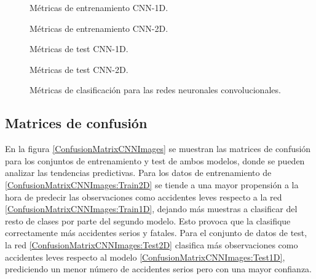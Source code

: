     \begin{figure}[H]
        \scriptsize
        \renewcommand{\arraystretch}{1.1}
        \begin{subtable}{.5\textwidth}        
          \caption{Métricas de entrenamiento CNN-1D.}
          \label{ClassificationReportCNN:TrainCNN1D}
        \end{subtable}
        \hspace{1em}
        \begin{subtable}{.5\textwidth}
          \centering
          \caption{Métricas de entrenamiento CNN-2D.}
          \label{ClassificationReportCNN:TrainCNN2D}
        \end{subtable}
        \vspace*{2mm}
        \begin{subtable}{.5\textwidth}     
          \caption{Métricas de test CNN-1D.}
          \label{ClassificationReportCNN:TestCNN1D}
        \end{subtable}
        \hspace{.75em}
        \begin{subtable}{.5\textwidth}     
          \centering
          \caption{Métricas de test CNN-2D.}
          \label{ClassificationReportCNN:TestCNN2D}
        \end{subtable}
        \caption{Métricas de clasificación para las redes neuronales convolucionales.}
        \label{ClassificationReportCNN}
    \end{figure}
  

  \subsection{Matrices de confusión}

    En la figura \eqref{ConfusionMatrixCNNImages} se muestran las matrices de confusión para los conjuntos de entrenamiento y test de ambos modelos, donde se pueden analizar las tendencias predictivas. Para los datos de entrenamiento de  \eqref{ConfusionMatrixCNNImages:Train2D} se tiende a una mayor propensión a la hora de predecir las observaciones como accidentes leves respecto a la red  \eqref{ConfusionMatrixCNNImages:Train1D}, dejando más muestras a clasificar del resto de clases por parte del segundo modelo. Esto provoca que la  clasifique correctamente más accidentes serios y fatales. Para el conjunto de datos de test, la red  \eqref{ConfusionMatrixCNNImages:Test2D} clasifica más observaciones como accidentes leves respecto al modelo  \eqref{ConfusionMatrixCNNImages:Test1D}, prediciendo un menor número de accidentes serios pero con una mayor confianza.

